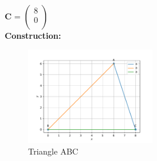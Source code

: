 \documentclass{article}
\begin{document}
              \vspace{5mm}
             \\ \raggedright  \textbf{C} = $\begin{pmatrix}
                  8\\
                  0\\
              \end{pmatrix}$
              \\
	      \vspace{5mm}
\textbf{Construction:}\\
\begin{figure}[h]
 \begin{center}
	 \includegraphics[width=0.5\textwidth]{figs/triangle.pdf}
 \end{center}
 \caption{Triangle ABC}
 \label{fig:Fig1}
\end{figure}	
\end{document}
